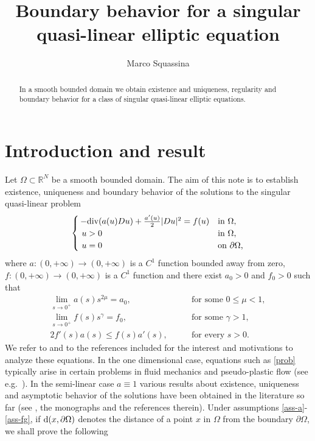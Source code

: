\documentclass[10pt]{amsart}
\title[Boundary behavior for a singular PDE]{Boundary behavior for a singular \\ quasi-linear elliptic equation}
\author[M.~Squassina]{Marco Squassina}
\numberwithin{equation}{section}
\theoremstyle{definition}
\newcommand{\R}{{\mathbb R}}
\newcommand{\dvg}{{\rm div}}
\begin{document}
\begin{abstract}
In a smooth bounded domain we obtain existence and uniqueness, regularity and 
boundary behavior for a class of singular quasi-linear elliptic equations.
\end{abstract}


\maketitle


\section{Introduction and result}

Let $\Omega\subset\R^N$ be a smooth bounded domain.
The aim of this note is to establish existence, uniqueness and 
boundary behavior of the solutions to the singular quasi-linear problem
\begin{equation}
\label{prob}
\begin{cases}
\,-\dvg(a(u)Du)+\frac{a'(u)}{2}|Du|^2=f(u)   & \text{in $\Omega$,} \\
\,\, u>0 &  \text{in $\Omega$,}  \\
\,\, u=0 &  \text{on $\partial\Omega$,}    
\end{cases}
\end{equation}
where $a:(0,+\infty)\to (0,+\infty)$ is a $C^1$ function 
bounded away from zero, $f:(0,+\infty)\to (0,+\infty)$ is a $C^1$ function
and there exist $a_0>0$ and $f_0>0$ such that
\begin{align}
\lim_{s\to 0^+} a(s)s^{2\mu}=a_0, & \qquad\text{for some $0\leq \mu<1$},   \label{ass-a} \\
\lim_{s\to 0^+} f(s)s^\gamma=f_0, & \qquad\text{for some $\gamma>1$},   \label{ass-f} \\
2f'(s)a(s)\leq f(s)a'(s), & \qquad\text{for every $s>0$}. \label{ass-fg}
\end{align}
We refer to \cite{squassmono} and to the references included
for the interest and motivations to analyze these equations.
In the one dimensional case, equations such as \eqref{prob} typically arise in certain problems in 
fluid mechanics and pseudo-plastic flow (see e.g.\ \cite{callegari,stuart}). In the semi-linear case $a\equiv 1$
various results about existence, uniqueness and asymptotic behavior of the solutions have been obtained
in the literature so far (see \cite{craRabTar,lairshak,lazmec,zhangcheng,gherad-paper}, the monographs \cite{gherad-book,radu-hand}
and the references therein). 
Under assumptions \eqref{ass-a}-\eqref{ass-fg}, if ${\rm d}(x,\partial\Omega)$ denotes the distance of a point $x$ in $\Omega$
from the boundary $\partial\Omega$, we shall prove the following
\end{document}
